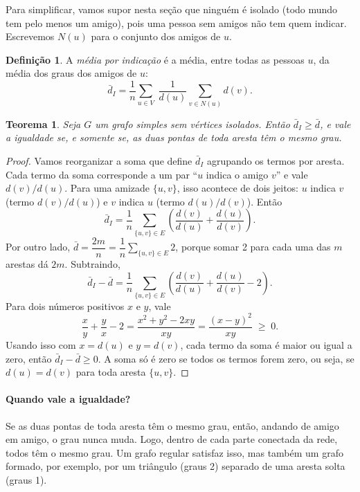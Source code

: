 \documentclass[12pt,a4paper]{article}
\theoremstyle{plain}
\newtheorem{teorema}{Teorema}
\theoremstyle{definition}
\newtheorem{definicao}{Definição}
\theoremstyle{remark}
\newcommand{\dm}{\bar d}          %
\newcommand{\dI}{\bar d_{I}}      %
\begin{document}
Para simplificar, vamos supor nesta seção que ninguém é isolado (todo
mundo tem pelo menos um amigo), pois uma pessoa sem amigos não tem quem
indicar. Escrevemos $N(u)$ para o conjunto dos amigos de $u$.

\begin{definicao}
A \emph{média por indicação} é a média, entre todas as pessoas $u$, da
média dos graus dos amigos de $u$:
\[
\dI = \frac{1}{n}\sum_{u\in V}\;\frac{1}{d(u)}\sum_{v\in N(u)} d(v).
\]
\end{definicao}

\begin{teorema}\label{teo:indicacao}
Seja $G$ um grafo simples sem vértices isolados. Então $\dI \ge \dm$, e
vale a igualdade se, e somente se, as duas pontas de toda aresta têm o
mesmo grau.
\end{teorema}

\begin{proof}
Vamos reorganizar a soma que define $\dI$ agrupando os termos por
aresta. Cada termo da soma corresponde a um par “$u$ indica o amigo
$v$” e vale $d(v)/d(u)$. Para uma amizade $\{u,v\}$, isso acontece de
dois jeitos: $u$ indica $v$ (termo $d(v)/d(u)$) e $v$ indica $u$ (termo
$d(u)/d(v)$). Então
\[
\dI = \frac{1}{n}\sum_{\{u,v\}\in E}\left(\frac{d(v)}{d(u)} + \frac{d(u)}{d(v)}\right).
\]
Por outro lado, $\dm = \dfrac{2m}{n} = \dfrac{1}{n}\displaystyle\sum_{\{u,v\}\in E} 2$,
porque somar 2 para cada uma das $m$ arestas dá $2m$. Subtraindo,
\[
\dI - \dm = \frac{1}{n}\sum_{\{u,v\}\in E}\left(\frac{d(v)}{d(u)} + \frac{d(u)}{d(v)} - 2\right).
\]
Para dois números positivos $x$ e $y$, vale
\[
\frac{x}{y} + \frac{y}{x} - 2 = \frac{x^2 + y^2 - 2xy}{xy} = \frac{(x-y)^2}{xy} \;\ge\; 0 .
\]
Usando isso com $x=d(u)$ e $y=d(v)$, cada termo da soma é maior ou
igual a zero, então $\dI - \dm \ge 0$. A soma só é zero se todos os
termos forem zero, ou seja, se $d(u) = d(v)$ para toda aresta $\{u,v\}$.
\end{proof}

\paragraph{Quando vale a igualdade?} Se as duas pontas de toda aresta
têm o mesmo grau, então, andando de amigo em amigo, o grau nunca muda.
Logo, dentro de cada parte conectada da rede, todos têm o mesmo grau.
Um grafo regular satisfaz isso, mas também um grafo formado, por
exemplo, por um triângulo (graus 2) separado de uma aresta solta (graus
1).
\end{document}
